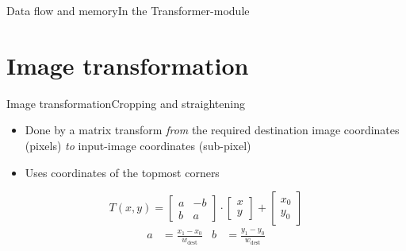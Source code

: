 \documentclass[10pt]{beamer}
\begin{document}
\begin{frame}{Data flow and memory}{In the Transformer-module}
\end{frame}

\section{Image transformation}

\begin{frame}{Image transformation}{Cropping and straightening}
\begin{itemize}
    \item Done by a matrix transform \emph{from} the required destination image coordinates (pixels) \emph{to} input-image coordinates (sub-pixel)
    \item Uses coordinates of the topmost corners
\end{itemize}
\pause

    \begin{equation*}
        T(x,y) = \begin{bmatrix}
                a&-b \\
                b&a
            \end{bmatrix} \cdot
            \begin{bmatrix}x\\y\end{bmatrix}
                + \begin{bmatrix}x_0\\y_0\end{bmatrix}
    \end{equation*}
    \begin{align*}
        a &= \frac{x_1 - x_0}{w_\text{dest}} &
        b &= \frac{y_1 - y_0}{w_\text{dest}}
    \end{align*}
\end{frame}
\end{document}
